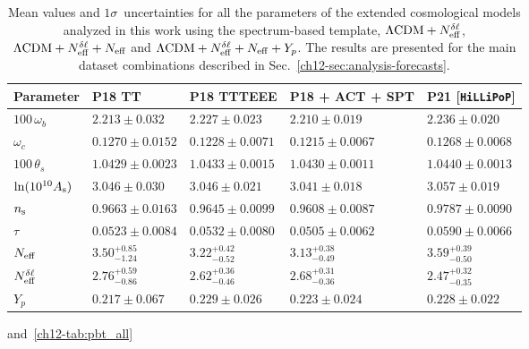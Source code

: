 \begin{subappendices}
\begin{table}
\begin{subtable}{\textwidth}
		
		\begin{tabular}{l l l l l}
				\toprule
			Parameter			& P18 TT					& P18 TTTEEE				& P18 + ACT + SPT			& P21 [\texttt{HiLLiPoP}]	\\
				\midrule[0.065em]
			$100\,\omega_b$		& $2.213 \pm 0.032$			& $2.227 \pm 0.023$			& $2.210 \pm 0.019$			& $2.236 \pm 0.020$			\\
			$\omega_c$			& $0.1270 \pm 0.0152$		& $0.1228 \pm 0.0071$		& $0.1215 \pm 0.0067$		& $0.1268 \pm 0.0068$		\\
			$100\,\theta_s$		& $1.0429 \pm 0.0023$		& $1.0433 \pm 0.0015$		& $1.0430 \pm 0.0011$		& $1.0440 \pm 0.0013$		\\
			$\ln(10^{10}A_\mathrm{s})$	& $3.046 \pm 0.030$			& $3.046 \pm 0.021$			& $3.041 \pm 0.018$			& $3.057 \pm 0.019$			\\
			$n_\mathrm{s}$				& $0.9663 \pm 0.0163$		& $0.9645 \pm 0.0099$		& $0.9608 \pm 0.0087$		& $0.9787 \pm 0.0090$		\\
			$\tau$				& $0.0523 \pm 0.0084$		& $0.0532 \pm 0.0080$		& $0.0505 \pm 0.0062$		& $0.0590 \pm 0.0066$		\\
			$N_\mathrm{eff}$				& $3.50^{+0.85}_{-1.24}$	& $3.22^{+0.42}_{-0.52}$	& $3.13^{+0.38}_{-0.49}$	& $3.59^{+0.39}_{-0.50}$	\\
			$N_\mathrm{eff}^{\delta\ell}$		& $2.76^{+0.59}_{-0.86}$	& $2.62^{+0.36}_{-0.46}$	& $2.68^{+0.31}_{-0.36}$	& $2.47^{+0.32}_{-0.35}$	\\
			$Y_p$				& $0.217 \pm 0.067$			& $0.229 \pm 0.026$			& $0.223 \pm 0.024$			& $0.228 \pm 0.022$			\\
				\bottomrule
		\end{tabular}
	
		\caption[Spectrum-based constraints on all cosmological parameters]{$\Lambda\mathrm{CDM} + \Nmultipole + \Neff + Y_p$}
\end{subtable}
	\caption[Full spectrum-based cosmological constraints]{Mean values and $1\sigma$~uncertainties for all the parameters of the extended cosmological models analyzed in this work using the spectrum-based template, $\Lambda\mathrm{CDM} + N_\mathrm{eff}^{\delta\ell}$, $\Lambda\mathrm{CDM} + N_\mathrm{eff}^{\delta\ell} + N_\mathrm{eff}$ and $\Lambda\mathrm{CDM} + \Nmultipole + \Neff + Y_p$. The results are presented for the main dataset combinations described in Sec.~\ref{ch12-sec:analysis-forecasts}.}
	\label{ch12-tab:sbt_all}
\end{table}
and~\ref{ch12-tab:pbt_all}
\begin{table}
	\centering\footnotesize\setlength{\tabcolsep}{5pt}
	\begin{subtable}{\textwidth}
		\centering



\end{subtable}
\end{table}
\end{subappendices}
